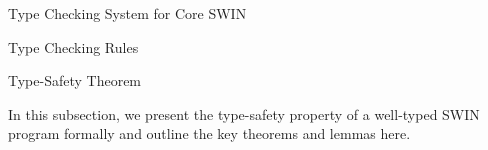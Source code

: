 \begin{section}{Type Checking System for Core SWIN}
\begin{subsection}{Type Checking Rules}

\end{subsection}

\begin{subsection}{Type-Safety Theorem}
\label{sec:theorem}

In this subsection, we present the type-safety property of a well-typed SWIN program formally and outline the key theorems and lemmas here. 


\end{subsection}
\end{section}
